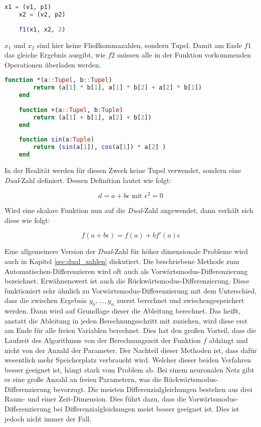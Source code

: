 \begin{lstlisting}[language=Julia]
	x1 = (v1, p1)
    x2 = (v2, p2)
    
    f1(x1, x2, 2)
\end{lstlisting}

$x_1$ und $x_2$ sind hier keine Fließkommazahlen, sondern Tupel.
Damit am Ende $f1$ das gleiche Ergebnis ausgibt, wie $f2$ müssen alle in der Funktion vorkommenden Operationen überladen werden.

\begin{lstlisting}[language=Julia]
	function *(a::Tupel, b::Tupel)
    	return (a[1] * b[1], a[1] * b[2] + a[2] * b[1]) 
    end
    
    function +(a::Tupel, b:Tuple)
    	return (a[1] + b[1], a[2] + b[2])
    end
    
    function sin(a:Tuple)
    	return (sin(a[1]), cos(a[1]) * a[2] ) 
    end
\end{lstlisting}

In der Realität werden für diesen Zweck keine Tupel verwendet, sondern eine \textit{Dual}-Zahl definiert.
Dessen Definition lautet wie folgt:

\begin{equation}
	d = a + b \epsilon \text{ mit } \epsilon^2 = 0
\end{equation}

Wird eine skalare Funktion nun auf die \textit{Dual}-Zahl angewendet, dann verhält sich diese wie folgt:

\begin{equation}
	f( a + b \epsilon) = f(a) + b f'(a) \epsilon
\end{equation}

Eine allgemeinere Version der \textit{Dual}-Zahl für höher dimensionale Probleme wird auch in Kapitel \ref{sec:dual_zahlen} diskutiert.
Die beschriebene Methode zum Automatischen-Differenzieren wird oft auch als Vorwärtsmodus-Differenzierung bezeichnet.
Erwähnenswert ist auch die Rückwärtsmodus-Differenzierung.
Diese funktioniert sehr ähnlich zu Vorwärtsmodus-Differenzierung
mit dem Unterschied, dass die zwischen Ergebnis $y_0, ... , y_n$ zuerst berechnet und zwischengespeichert werden.
Dann wird auf Grundlage dieser die Ableitung berechnet.
Das heißt, anstatt die Ableitung in jeden Berechnungsschritt mit zuziehen, wird diese erst am Ende für alle freien Variablen berechnet.
Dies hat den großen Vorteil, dass die Laufzeit des Algorithmus von der Berechnungszeit der Funktion $f$ abhängt und nicht von der Anzahl der Parameter.
Der Nachteil dieser Methoden ist, dass dafür wesentlich mehr Speicherplatz verbraucht wird.
Welcher dieser beiden Verfahren besser geeignet ist, hängt stark vom Problem ab.
Bei einem neuronalen Netz gibt es eine große Anzahl an freien Parametern, was die Rückwärtsmodus-Differenzierung bevorzugt.
Die meisten Differenzialgleichungen bestehen aus drei Raum- und einer Zeit-Dimension.
Dies führt dazu, dass die Vorwärtsmodus-Differenzierung bei Differenzialgleichungen meist besser geeignet ist.
Dies ist jedoch nicht immer der Fall.

